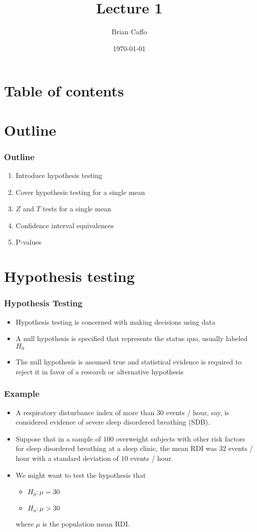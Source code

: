 \documentclass{beamer}
\title{Lecture 1}
\author{Brian Caffo}
\date{\today}
\institute[Department of Biostatistics]{
  Department of Biostatistics \\
  Johns Hopkins Bloomberg School of Public Health\\
  Johns Hopkins University
}
\begin{document}
\frame{\titlepage}

\section{Table of contents}

\section{Outline}
  \begin{frame}\frametitle{Outline}
  \begin{enumerate}
  \item Introduce hypothesis testing
  \item Cover hypothesis testing for a single mean
  \item $Z$ and $T$ tests for a single mean
  \item Confidence interval equivalences
  \item P-values
 \end{enumerate}
 \end{frame}

\section{Hypothesis testing}
\begin{frame}\frametitle{Hypothesis Testing}
\begin{itemize}
\item Hypothesis testing is concerned with making decisions using data
\item A null hypothesis is specified that represents the status quo,
  usually labeled $H_0$
\item The null hypothesis is assumed true and statistical evidence is required
  to reject it in favor of a research or alternative hypothesis 
\end{itemize}
\end{frame}

\begin{frame}\frametitle{Example}
\begin{itemize}
\item A respiratory disturbance index of more than $30$ events / hour, say, is 
  considered evidence of severe sleep disordered breathing (SDB).
\item Suppose that in a sample of $100$ overweight subjects with other
  risk factors for sleep disordered breathing at a sleep clinic, the
  mean RDI was $32$ events / hour with a standard deviation of $10$ events / hour.
\item We might want to test the hypothesis that 
  \begin{itemize}
  \item $H_0 : \mu = 30$
  \item $H_a : \mu > 30$
  \end{itemize}
  where $\mu$ is the population mean RDI.
\end{itemize}
\end{frame}
\end{document}
